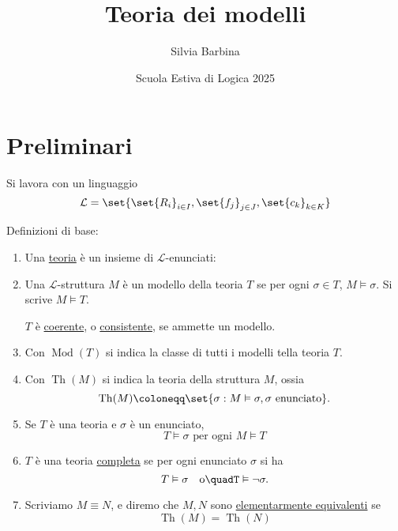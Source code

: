 \documentclass[10pt]{article}
\author{Silvia Barbina}
\date{Scuola Estiva di Logica 2025}
\title{Teoria dei modelli}
\newcommand{\1}{\mathds{1}}
\theoremstyle{definition}%
\theoremstyle{plain}
\theoremstyle{remark}
\begin{document}
\maketitle
\tableofcontents

\begin{latex}
\clearpage
\end{latex}
\section{Preliminari}
\label{sec:org21fd3a1}

Si lavora con un linguaggio
\begin{equation*}
\mathcal{L} = \set{\set{R_{i}}_{i \in I}, \set{f_{j}}_{j \in J}, \set{c_{k}}_{k \in K}}
\end{equation*}

Definizioni di base:
\begin{enumerate}
\item Una \uline{teoria} è un insieme di \(\mathcal{L}\)-enunciati:
\item Una \(\mathcal{L}\)-struttura \(M\) è un modello della teoria \(T\) se per ogni \(\sigma \in T\), \(M\vDash \sigma\). Si scrive \(M\vDash T\).

\(T\) è \uline{coerente}, o \uline{consistente}, se ammette un modello.
\item Con \(\operatorname{Mod}(T)\) si indica la classe di tutti i modelli tella teoria \(T\).
\item Con \(\operatorname{Th}(M)\) si indica la teoria della struttura \(M\), ossia
\begin{equation*}
 \operatorname{Th}(M) \coloneqq\set{\sigma: M\vDash\sigma,\sigma\text{ enunciato}}.
\end{equation*}
\item Se \(T\) è una teoria e \(\sigma\) è un enunciato,
\begin{equation*}
 T\vDash\sigma\text{ per ogni }M\vDash T
\end{equation*}
\item \(T\) è una teoria \uline{completa} se per ogni enunciato \(\sigma\) si ha
\begin{equation*}
 T\vDash \sigma\quad\text{o}\quadT\vDash\lnot\sigma.
\end{equation*}
\item Scriviamo \(M\equiv N\), e diremo che \(M,N\) sono \uline{elementarmente equivalenti} se
\begin{equation*}
 \operatorname{Th}(M)=\operatorname{Th}(N)
\end{equation*}
\end{enumerate}
\end{document}
